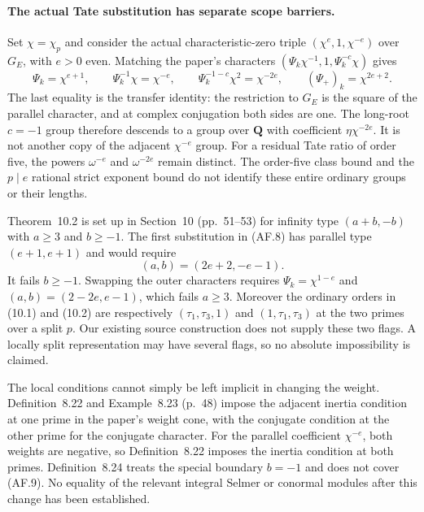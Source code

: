 \paragraph{The actual Tate substitution has separate scope barriers.}
Set $\chi=\chi_p$ and consider the actual characteristic-zero
triple $(\chi^e,1,\chi^{-e})$ over $G_E$, with $e>0$ even.
Matching the paper's characters
$(\Psi_k\chi^{-1},1,\Psi_k^{-c}\chi)$ gives
\[
 \Psi_k=\chi^{e+1},\qquad
 \Psi_k^{-1}\chi=\chi^{-e},\qquad
 \Psi_k^{-1-c}\chi^2=\chi^{-2e},\qquad
 (\Psi_+)_k=\chi^{2e+2}.                                    \tag{AF.8}
\]
The last equality is the transfer identity: the restriction to $G_E$
is the square of the parallel character, and at complex conjugation
both sides are one.  The long-root $c=-1$ group therefore descends
to a group over $\mathbf Q$ with coefficient
$\eta\chi^{-2e}$.  It is not another copy of the adjacent
$\chi^{-e}$ group.  For a residual Tate ratio of order five,
the powers $\omega^{-e}$ and $\omega^{-2e}$ remain distinct.
The order-five class bound and the $p\mid e$ rational strict exponent
bound do not identify these entire ordinary groups or their lengths.

Theorem~10.2 is set up in Section~10 (pp.~51--53) for infinity type
$(a+b,-b)$ with $a\geq3$ and $b\geq-1$.  The first substitution
in (AF.8) has parallel type $(e+1,e+1)$ and would require
\[
 (a,b)=(2e+2,-e-1).
                                                               \tag{AF.9}
\]
It fails $b\geq-1$.  Swapping the outer characters requires
$\Psi_k=\chi^{1-e}$ and $(a,b)=(2-2e,e-1)$, which fails
$a\geq3$.  Moreover the ordinary orders in (10.1) and (10.2)
are respectively $(\tau_1,\tau_3,1)$ and $(1,\tau_1,\tau_3)$
at the two primes over a split $p$.  Our existing source construction
does not supply these two flags.  A locally split representation may
have several flags, so no absolute impossibility is claimed.

The local conditions cannot simply be left implicit in changing the
weight.  Definition~8.22 and Example~8.23 (p.~48) impose the adjacent
inertia condition at one prime in the paper's weight cone, with the
conjugate condition at the other prime for the conjugate character.
For the parallel coefficient $\chi^{-e}$, both weights are negative,
so Definition~8.22 imposes the inertia condition at both primes.
Definition~8.24 treats the special boundary $b=-1$ and does not cover
(AF.9).  No equality of the relevant integral Selmer or conormal
modules after this change has been established.

